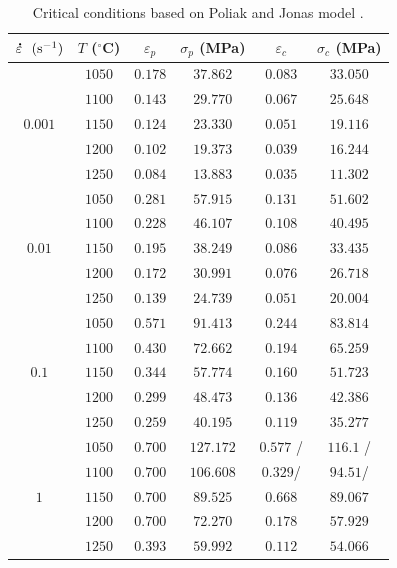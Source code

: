 \documentclass[metals,article,submit,pdftex,moreauthors]{Definitions/mdpi}
\DeclareRobustCommand{\mdot}[1]{\accentset{\mbox{\bfseries .}}{#1}}
\begin{document}
\begin{table}[h!]
\caption{Critical conditions based on Poliak and Jonas model  \cite{najafizadeh2006predicting}.}\vspace{-5mm}
\begin{center}
\begin{tabular}{cccccc}
\toprule
$\mdot{\varepsilon}~~(\text{s}^{-1})$ & $T$ ($^\circ$C) & $\varepsilon_p$ & $\sigma_p$ (MPa)& $\varepsilon_c$ & $\sigma_c$ (MPa) \\
\hline
         & $1050$  & $0.178$  & $37.862$& $0.083$ & $33.050$ \\
& $1100$ & $0.143$ & $29.770$ & $0.067$ & $25.648$ \\
$0.001$  & $1150$  & $0.124$  & $23.330$& $0.051$ & $19.116$ \\
& $1200$ & $0.102$ & $19.373$ & $0.039$ & $16.244$ \\
& $1250$ & $0.084$ & $13.883$ & $0.035$ & $11.302$ \\

& $1050$ & $0.281$ & $57.915$ & $0.131$ & $51.602$ \\
& $1100$ & $0.228$ & $46.107$ & $0.108$ & $40.495$ \\
$0.01$   & $1150$  & $0.195$  & $38.249$& $0.086$ & $33.435$ \\
& $1200$ & $0.172$ & $30.991$ & $0.076$ & $26.718$ \\
& $1250$ & $0.139$ & $24.739$ & $0.051$ & $20.004$ \\

& $1050$ & $0.571$ & $91.413$ & $0.244$ & $83.814$ \\
& $1100$ & $0.430$ & $72.662$ & $0.194$ & $65.259$ \\
$0.1$    & $1150$  & $0.344$  & $57.774$& $0.160$ & $51.723$ \\
& $1200$ & $0.299$ & $48.473$ & $0.136$ & $42.386$ \\
& $1250$ & $0.259$ & $40.195$ & $0.119$ & $35.277$ \\

& $1050$ & $0.700$ & $127.172$&$0.577$ /&$116.1$ / \\ 
& $1100$ & $0.700$ & $106.608$& $0.329$/& $94.51$/ \\
$1$      & $1150$  & $0.700$  & $89.525$& $0.668$ & $89.067$ \\
& $1200$ & $0.700$ & $72.270$ & $0.178$ & $57.929$ \\
& $1250$ & $0.393$ & $59.992$ & $0.112$ & $54.066$ \\
\bottomrule
\end{tabular}	
\end{center}
\label{tab:OPparams}
\end{table}
\end{document}
